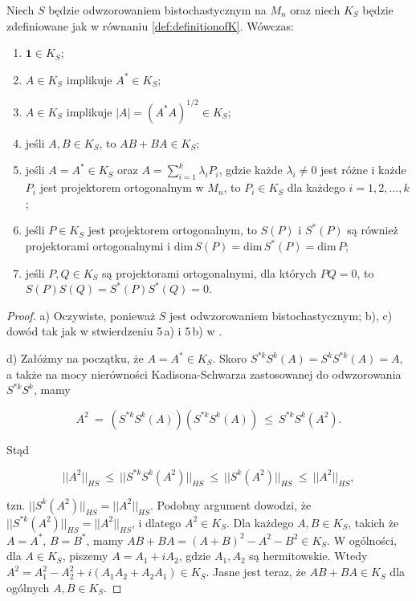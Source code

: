 {\begin{Lemma}
\label{lem:propertiesofK}
Niech $S$ będzie odwzorowaniem bistochastycznym na $M_{n}$
oraz niech $K_{S}$ będzie zdefiniowane jak w równaniu
\eqref{def:definitionofK}.
Wówczas:
\let \oldlabelenumi \labelenumi
\renewcommand{\labelenumi}{\alph{enumi})}
\begin{enumerate}
\item $\mathbf{1} \in K_{S}$;
\item $A \in K_{S}$ implikuje $A^{*} \in K_{S}$;
\item  $A  \in K_{S}$ implikuje
$|A| = (A^{*}A)^{1/2} \in K_{S}$;
\item jeśli $A, B \in K_{S}$, to $AB + BA \in K_{S}$;
\item jeśli $A = A^{*} \in K_{S}$ oraz $A = \sum_{i=1}^{k} \lambda_{i} P_{i}$,
gdzie każde $\lambda_{i} \neq 0$ jest różne i
każde $P_{i}$ jest projektorem ortogonalnym w $M_{n}$,
to $P_{i} \in K_{S}$ dla każdego $i = 1,2,\ldots,k$;
\item jeśli $P \in K_{S}$ jest projektorem ortogonalnym,
to $S(P)$ i $S^{*}(P)$ są również projektorami ortogonalnymi i
$\mathrm{dim} \, S(P) = \mathrm{dim} \, S^{*}(P) = \mathrm{dim} \, P$;
\item jeśli $P, Q \in K_{S}$ są projektorami ortogonalnymi, dla których
$P Q = 0$,
to $S(P) S(Q) = S^{*}(P) S^{*}(Q) = 0$.
\end{enumerate}
\let \labelenumi \oldlabelenumi
\end{Lemma}

\begin{proof}
a) Oczywiste, ponieważ $S$ jest odwzorowaniem bistochastycznym;
b), c) dowód tak jak w stwierdzeniu 5\,a) i 5\,b) w \cite{olkiewicz1999environment}.

d)  Załóżmy na początku, że $A = A^{*} \in K_{S}$.
Skoro $S^{*k} S^{k}(A) = S^{k} S^{*k}(A) = A$,
a także na mocy nierówności Kadisona-Schwarza zastosowanej do odwzorowania
$S^{*k} S^{k}$, mamy
\begin{linenomath*}
 \begin{equation}
A^{2} \: = \: \left( S^{*k} S^{k}(A) \right) \left( S^{*k} S^{k}(A) \right)
    \: \leq \: S^{*k} S^{k}(A^{2}).
 \end{equation}
\end{linenomath*}
Stąd
\begin{linenomath*}
 \begin{equation}
||A^{2}||_{HS} \: \leq \: || S^{*k} S^{k}(A^{2}) ||_{HS} \: \leq \:
    || S^{k}(A^{2}) ||_{HS} \: \leq \: ||A^{2}||_{HS},
 \end{equation}
\end{linenomath*}
tzn. $|| S^{k}(A^{2}) ||_{HS} = ||A^{2}||_{HS}$.
Podobny argument dowodzi, że
$|| S^{*k}(A^{2}) ||_{HS} = ||A^{2}||_{HS}$,
i dlatego $A^{2} \in K_{S}$.
Dla każdego $A, B \in K_{S}$, takich że $A = A^{*}$, $B = B^{*}$,
mamy
$AB + BA = (A + B)^{2} - A^{2} - B^{2} \in K_{S}$.
W ogólności, dla $A \in K_{S}$, piszemy
$A = A_{1} + i A_{2}$, gdzie $A_{1}, A_{2}$ są hermitowskie.
Wtedy
$A^{2} = A_{1}^{2} - A_{2}^{2} + i(A_{1} A_{2} + A_{2} A_{1}) \in K_{S}$.
Jasne jest teraz, że $AB+BA \in K_{S}$ dla ogólnych $A,B \in K_{S}$.


\end{proof}}
